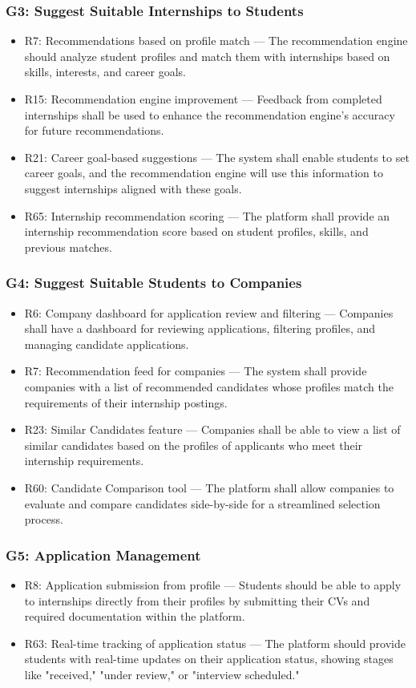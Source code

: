 \subsubsection{G3: Suggest Suitable Internships to Students}
\begin{itemize}
    \item R7: Recommendations based on profile match — The recommendation engine should analyze student profiles and match them with internships based on skills, interests, and career goals.
    \item R15: Recommendation engine improvement — Feedback from completed internships shall be used to enhance the recommendation engine’s accuracy for future recommendations.
    \item R21: Career goal-based suggestions — The system shall enable students to set career goals, and the recommendation engine will use this information to suggest internships aligned with these goals.
    \item R65: Internship recommendation scoring — The platform shall provide an internship recommendation score based on student profiles, skills, and previous matches.
\end{itemize}

\subsubsection{G4: Suggest Suitable Students to Companies}
\begin{itemize}
    \item R6: Company dashboard for application review and filtering — Companies shall have a dashboard for reviewing applications, filtering profiles, and managing candidate applications.
    \item R7: Recommendation feed for companies — The system shall provide companies with a list of recommended candidates whose profiles match the requirements of their internship postings.
    \item R23: Similar Candidates feature — Companies shall be able to view a list of similar candidates based on the profiles of applicants who meet their internship requirements.
    \item R60: Candidate Comparison tool — The platform shall allow companies to evaluate and compare candidates side-by-side for a streamlined selection process.
\end{itemize}

\subsubsection{G5: Application Management}
\begin{itemize}
    \item R8: Application submission from profile — Students should be able to apply to internships directly from their profiles by submitting their CVs and required documentation within the platform.
    \item R63: Real-time tracking of application status — The platform should provide students with real-time updates on their application status, showing stages like "received," "under review," or "interview scheduled."
\end{itemize}

